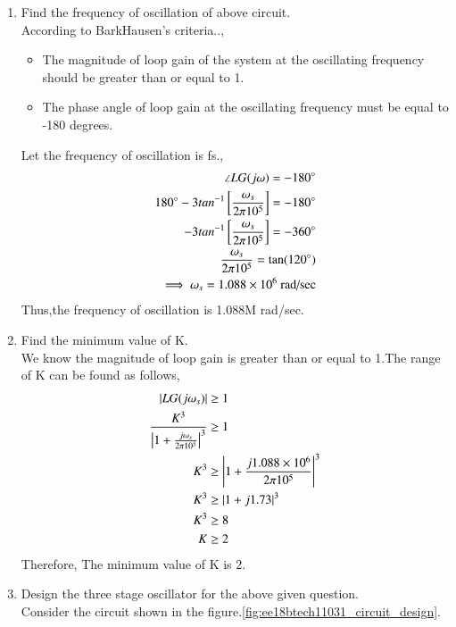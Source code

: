 \begin{enumerate}[label=\thesubsection.\arabic*.,ref=\thesubsection.\theenumi]
\item Find the frequency of oscillation of above circuit.\\
\solution According to BarkHausen's criteria..,
\begin{itemize}
    \item The magnitude of loop gain of the system at the oscillating frequency should be greater than or equal to 1.
    \item The phase angle of loop gain at the oscillating frequency must be equal to -180 degrees.
\end{itemize}
Let the frequency of oscillation is fs.,
\begin{align}
    \angle LG(j\omega) = -180\degree\\
    180\degree - 3tan^{-1}\sbrak{\frac{\omega_s}{2\pi10^5}} = -180\degree \\
    - 3tan^{-1}\sbrak{\frac{\omega_s}{2\pi10^5}} = -360\degree\\
    \frac{\omega_s}{2\pi10^5} =  \tan(120\degree)\\
    \implies \omega_s = 1.088\times10^6\text{ rad/sec}\label{eq:ee18btech11031_frequency}
\end{align}
Thus,the frequency of oscillation is 1.088M rad/sec.
\item Find the minimum value of K.\\
\solution 
We know the magnitude of loop gain is greater than or equal to 1.The range of K can be found as follows,
\begin{align}
    \left\vert LG(j\omega_s)\right\vert &\geq 1 \\
    \frac{K^3}{\left\vert1+\frac{j\omega_s}{2\pi10^5}\right\vert^3} &\geq 1 \\
    K^3 &\geq \left\vert1+\frac{j1.088\times10^6}{2\pi10^5}\right\vert^3\\
     K^3 &\geq \left\vert1+j1.73\right\vert^3\\
     K^3 &\geq 8 \\
     K &\geq 2
\end{align}
Therefore, The minimum value of K is 2.
\item Design the three stage oscillator for the above given question.
\\
\solution Consider the circuit shown in the figure.\ref{fig:ee18btech11031_circuit_design}.\\
\begin{figure}[!hbt]
	\begin{center}
			\resizebox{\columnwidth}{!}{}

\end{center}
\end{figure}
\end{enumerate}
